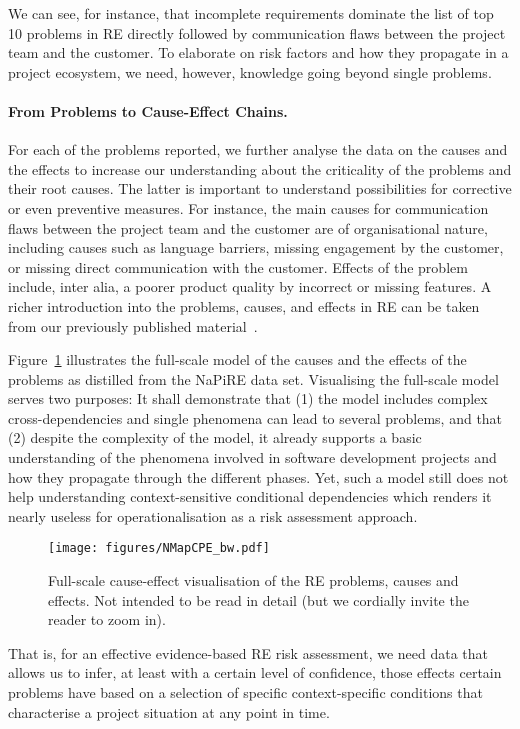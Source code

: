 \documentclass[lnbip]{svmultln}
\begin{document}
We can see, for instance, that incomplete requirements dominate the list of top 10 problems in RE directly followed by communication flaws between the project team and the customer. To elaborate on risk factors and how they propagate in a project ecosystem, we need, however, knowledge going beyond single problems.

\paragraph{From Problems to Cause-Effect Chains.}
For each of the problems reported, we further analyse the data on the causes and the effects to increase our understanding about the criticality of the problems and their root causes. The latter is important to understand possibilities for corrective or even preventive measures. For instance, the main causes for communication flaws between the project team and the customer are of organisational nature, including causes such as language barriers, missing engagement by the customer, or missing direct communication with the customer. Effects of the problem include, inter alia, a poorer product quality by incorrect or missing features. A richer introduction into the problems, causes, and effects in RE can be taken from our previously published material~\cite{MW+16}.

Figure~\ref{fig:CausesEffects} illustrates the full-scale model of the causes and the effects of the problems as distilled from the NaPiRE data set. Visualising the full-scale model serves two purposes: It shall demonstrate that (1) the model includes complex cross-dependencies and single phenomena can lead to several problems, and that (2) despite the complexity of the model, it already supports a basic understanding of the phenomena involved in software development projects and how they propagate through the different phases. Yet, such a model still does not help understanding context-sensitive conditional dependencies which renders it nearly useless for operationalisation as a risk assessment approach.
\begin{figure}[!hbtp]
\centering
  \texttt{[image: figures/NMapCPE\_bw.pdf]}\\
  \caption{Full-scale cause-effect visualisation of the RE problems, causes and effects. Not intended to be read in detail (but we cordially invite the reader to zoom in).}
  \label{fig:CausesEffects}
\end{figure} 
That is, for an effective evidence-based RE risk assessment, we need data that allows us to infer, at least with a certain level of confidence, those effects certain problems have based on a selection of specific context-specific conditions that characterise a project situation at any point in time.
\end{document}
